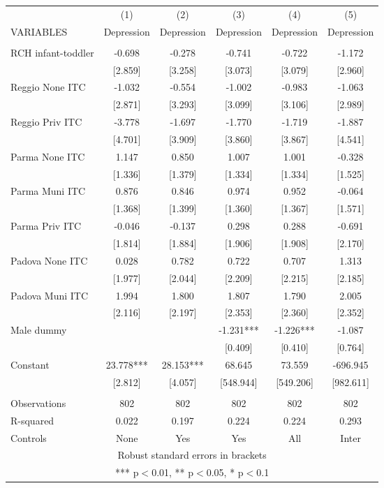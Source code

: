 \begin{tabular}{lccccc} \hline
 & (1) & (2) & (3) & (4) & (5) \\
VARIABLES & Depression & Depression & Depression & Depression & Depression \\ \hline
 &  &  &  &  &  \\
RCH infant-toddler & -0.698 & -0.278 & -0.741 & -0.722 & -1.172 \\
 & [2.859] & [3.258] & [3.073] & [3.079] & [2.960] \\
Reggio None ITC & -1.032 & -0.554 & -1.002 & -0.983 & -1.063 \\
 & [2.871] & [3.293] & [3.099] & [3.106] & [2.989] \\
Reggio Priv ITC & -3.778 & -1.697 & -1.770 & -1.719 & -1.887 \\
 & [4.701] & [3.909] & [3.860] & [3.867] & [4.541] \\
Parma None ITC & 1.147 & 0.850 & 1.007 & 1.001 & -0.328 \\
 & [1.336] & [1.379] & [1.334] & [1.334] & [1.525] \\
Parma Muni ITC & 0.876 & 0.846 & 0.974 & 0.952 & -0.064 \\
 & [1.368] & [1.399] & [1.360] & [1.367] & [1.571] \\
Parma Priv ITC & -0.046 & -0.137 & 0.298 & 0.288 & -0.691 \\
 & [1.814] & [1.884] & [1.906] & [1.908] & [2.170] \\
Padova None ITC & 0.028 & 0.782 & 0.722 & 0.707 & 1.313 \\
 & [1.977] & [2.044] & [2.209] & [2.215] & [2.185] \\
Padova Muni ITC & 1.994 & 1.800 & 1.807 & 1.790 & 2.005 \\
 & [2.116] & [2.197] & [2.353] & [2.360] & [2.352] \\
Male dummy &  &  & -1.231*** & -1.226*** & -1.087 \\
 &  &  & [0.409] & [0.410] & [0.764] \\
Constant & 23.778*** & 28.153*** & 68.645 & 73.559 & -696.945 \\
 & [2.812] & [4.057] & [548.944] & [549.206] & [982.611] \\
 &  &  &  &  &  \\
Observations & 802 & 802 & 802 & 802 & 802 \\
R-squared & 0.022 & 0.197 & 0.224 & 0.224 & 0.293 \\
 Controls & None & Yes & Yes & All & Inter \\ \hline
\multicolumn{6}{c}{ Robust standard errors in brackets} \\
\multicolumn{6}{c}{ *** p$<$0.01, ** p$<$0.05, * p$<$0.1} \\
\end{tabular}
